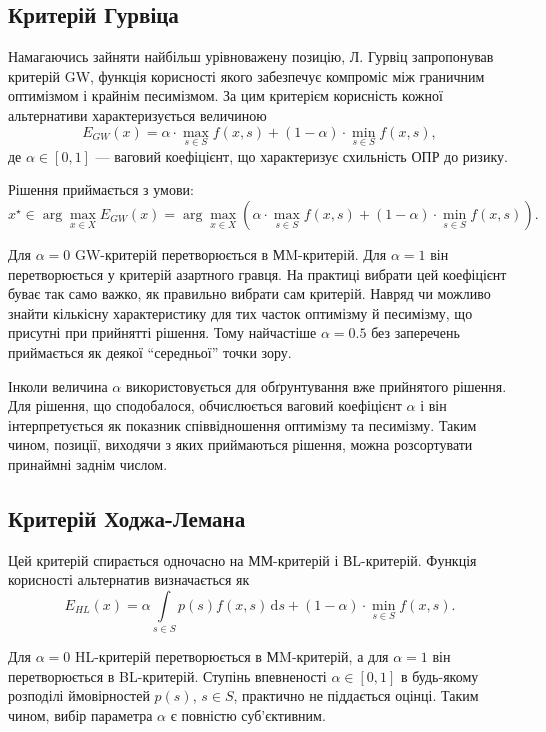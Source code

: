 \subsection{Критерій Гурвіца}

Намагаючись зайняти найбільш урівноважену позицію, Л. Гурвіц запропонував критерій GW, функція корисності якого забезпечує компроміс між граничним оптимізмом і крайнім песимізмом. За цим критерієм корисність кожної альтернативи характеризується величиною 
\[E_{GW}(x) = \alpha \cdot \max\limits_{s \in S} f(x, s) + (1 - \alpha) \cdot \min\limits_{s \in S} f(x, s),\]
де $\alpha \in [0, 1]$ --- ваговий коефіцієнт, що характеризує схильність ОПР до ризику. \medskip

Рішення приймається з умови:
\[x^\star \in \arg\max\limits_{x \in X} E_{GW}(x) = \arg\max\limits_{x \in X} \left( \alpha \cdot \max\limits_{s \in S} f(x, s) + (1 - \alpha) \cdot \min\limits_{s \in S} f(x, s) \right).\]

Для $\alpha = 0$ GW-критерій перетворюється в МM-критерій. Для $\alpha = 1$ він перетворюється у критерій азартного гравця. На практиці вибрати цей коефіцієнт буває так само важко, як правильно вибрати сам критерій. Навряд чи можливо знайти кількісну характеристику для тих часток оптимізму й песимізму, що присутні при прийнятті рішення. Тому найчастіше $\alpha = 0.5$ без заперечень приймається як деякої ``середньої'' точки зору. \medskip

Інколи величина $\alpha$ використовується для обґрунтування вже прийнятого рішення. Для рішення, що сподобалося, обчислюється ваговий коефіцієнт $\alpha$ і він інтерпретується як показник співвідношення оптимізму та песимізму. Таким чином, позиції, виходячи з яких приймаються рішення, можна розсортувати принаймні заднім числом.

\subsection{Критерій Ходжа-Лемана}

Цей критерій спирається одночасно на ММ-критерій і ВL-критерій. Функція корисності альтернатив визначається як
\[E_{HL}(x) = \alpha \int\limits_{s \in S} p(s) f(x, s) \, \mathrm{d} s + (1 - \alpha) \cdot \min\limits_{s \in S} f(x, s).\]

Для $\alpha = 0$ HL-критерій перетворюється в МM-критерій, а для $\alpha = 1$ він перетворюється в BL-критерій. Ступінь впевненості $\alpha \in [0, 1]$ в будь-якому розподілі ймовірностей $p(s)$, $s \in S$, практично не піддається оцінці. Таким чином, вибір параметра $\alpha$ є повністю суб'єктивним.

